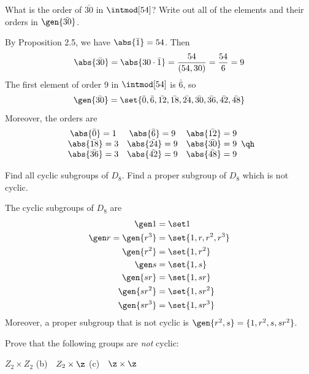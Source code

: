\begin{exercise}\label{ex2.3.10}
    What is the order of $\bar{30}$ in $\intmod[54]$? Write out all of the elements and their orders in $\gen{\bar{30}}$.
\end{exercise}

\begin{sol}
    By Proposition 2.5, we have $\abs{\bar 1} = 54$. Then
    \[\abs{\bar{30}} = \abs{30 \cdot \bar 1} = \frac{54}{(54, 30)} = \frac{54}{6} = 9\]
    The first element of order 9 in $\intmod[54]$ is $\bar 6$, so
    \[\gen{\bar{30}} = \set{\bar 0, \bar 6, \bar{12}, \bar{18}, \bar{24}, \bar{30}, \bar{36}, \bar{42}, \bar{48}}\]
    Moreover, the orders are
    \[
    \begin{array}{ccc}
        \abs{\bar 0} = 1 & \abs{\bar 6} = 9 & \abs{\bar{12}} = 9 \\
        \abs{\bar{18}} = 3 & \abs{\bar{24}} = 9 & \abs{\bar{30}} = 9 \\
        \abs{\bar{36}} = 3 & \abs{\bar{42}} = 9 & \abs{\bar{48}} = 9
    \end{array} \qh
    \] 
\end{sol}

\begin{exercise}\label{ex2.3.11}
    Find all cyclic subgroups of $D_8$. Find a proper subgroup of $D_8$ which is not cyclic.
\end{exercise}

\begin{sol}
    The cyclic subgroups of $D_8$ are
    \begin{align*}
        \gen 1 & = \set 1 \\
        \gen r = \gen{r^3} & = \set{1, r, r^2, r^3} \\
        \gen{r^2} & = \set{1, r^2} \\
        \gen s & = \set{1, s} \\
        \gen{sr} & = \set{1, sr} \\
        \gen{sr^2} & = \set{1, sr^2} \\
        \gen{sr^3} & = \set{1, sr^3}
    \end{align*}
    Moreover, a proper subgroup that is not cyclic is $\gen{r^2, s} = \{1, r^2, s, sr^2\}$.
\end{sol}


\begin{exercise}\label{ex2.3.12}
    Prove that the following groups are \emph{not} cyclic:
    \begin{subproblems}
        \item $Z_2 \times Z_2$ \quad (b)~~$Z_2 \times \z$ \quad (c)~~$\z \times \z$
    \end{subproblems}
\end{exercise}

